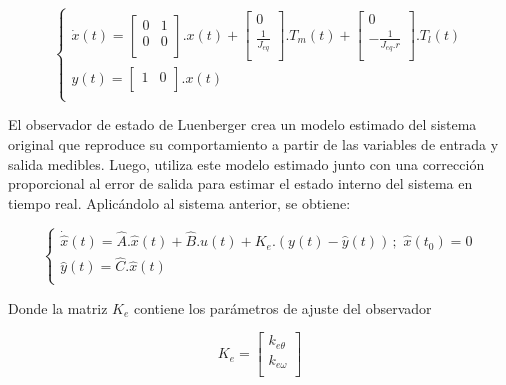 \documentclass{article}
\begin{document}
\begin{equation}
    \begin{cases}
        \dot{x}(t) = 
        \begin{bmatrix}
            0 & 1 \\
            0 & 0 \\
        \end{bmatrix}
        .x(t) + 
        \begin{bmatrix}
            0 \\
            \frac{1}{J_{eq}} \\
        \end{bmatrix}
        .T_m(t) +
        \begin{bmatrix}
            0 \\
            -\frac{1}{J_{eq}.r} \\
        \end{bmatrix}
        .T_l(t)\\
        y(t) = 
        \begin{bmatrix}
            1 & 0 \\
        \end{bmatrix}
        .x(t) \\
    \end{cases}
\end{equation}

El observador de estado de Luenberger crea un modelo estimado del sistema original que reproduce su 
comportamiento a partir de las variables de entrada y salida medibles. Luego, utiliza este modelo estimado 
junto con una corrección proporcional al error de salida para estimar el estado interno del sistema en 
tiempo real. Aplicándolo al sistema anterior, se obtiene:

\begin{equation}
    \begin{cases}
        \dot{\hat{x}}(t) = \hat{A}.\hat{x}(t) + \hat{B}.u(t) + K_e.(y(t) - \hat{y}(t)) \, ; \,\, \hat{x}(t_0) = 0\\
        \hat{y}(t) = \hat{C}.\hat{x}(t) \\
    \end{cases}
\end{equation}

Donde la matriz $K_e$ contiene los parámetros de ajuste del observador

\begin{equation}
    K_e = 
    \begin{bmatrix}
        k_{e\theta}\\ k_{e\omega} \\
    \end{bmatrix}
\end{equation}
\end{document}
